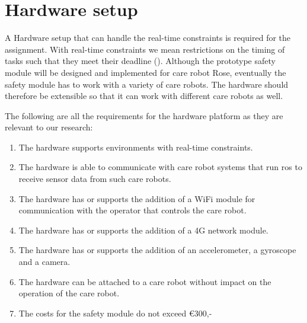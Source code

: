 \documentclass[12pt]{scrreprt}
\begin{document}
\section{Hardware setup}
\label{Hardware setup}

A Hardware setup that can handle the real-time constraints is required for the assignment. With real-time constraints we mean restrictions on the timing of tasks such that they meet their deadline (\cite{real-time_constraints}). Although the prototype safety module will be designed and implemented for care robot Rose, eventually the safety module has to work with a variety of care robots. The hardware should therefore be extensible so that it can work with different care robots as well.
\par
The following are all the requirements for the hardware platform as they are relevant to our research:

\begin{enumerate}
    \item The hardware supports environments with real-time constraints. \label{hsOne}
    \item The hardware is able to communicate with care robot systems that run \acrlong{ros} to receive sensor data from such care robots. \label{hsTwo}
    \item The hardware has or supports the addition of a WiFi module for communication with the operator that controls the care robot. \label{hsThree}
    \item The hardware has or supports the addition of a 4G network module. \label{hsFour}
    \item The hardware has or supports the addition of an accelerometer, a gyroscope and a camera. \label{hsFive}
    \item The hardware can be attached to a care robot without impact on the operation of the care robot. \label{hsSix}
    \item The costs for the safety module do not exceed €300,- \label{hsSeven}
\end{enumerate}
\end{document}
